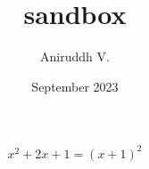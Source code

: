 \documentclass{artic le}
\title{sandbox}
\author{Aniruddh V.}
\date{September 2023}
\begin{document}
\maketitle
\section{}
\[x^2 + 2x + 1 = (x+1)^2 \]
\end{document}
